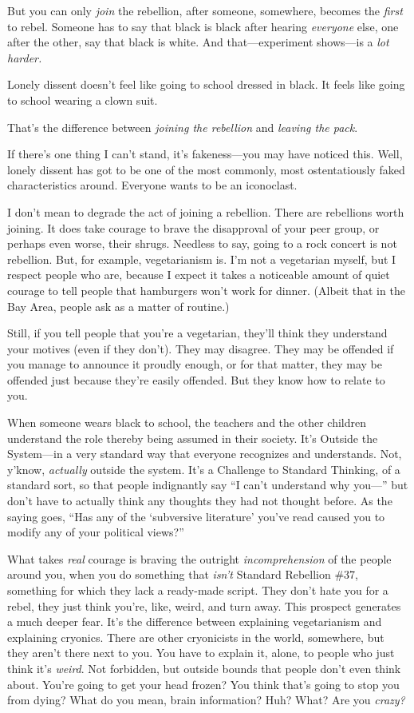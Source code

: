 {
 But you can only \textit{join} the rebellion, after someone,
somewhere, becomes the \textit{first} to rebel. Someone has to say that
black is black after hearing \textit{everyone} else, one after the
other, say that black is white. And that---experiment shows---is a
\textit{lot harder.}}

{
 Lonely dissent doesn't feel like going to school
dressed in black. It feels like going to school wearing a clown suit.}

{
 That's the difference between \textit{joining the
rebellion} and \textit{leaving the pack}.}

{
 If there's one thing I can't
stand, it's fakeness---you may have noticed this. Well,
lonely dissent has got to be one of the most commonly, most
ostentatiously faked characteristics around. Everyone wants to be an
iconoclast.}

{
 I don't mean to degrade the act of joining a
rebellion. There are rebellions worth joining. It does take courage to
brave the disapproval of your peer group, or perhaps even worse, their
shrugs. Needless to say, going to a rock concert is not rebellion. But,
for example, vegetarianism is. I'm not a vegetarian
myself, but I respect people who are, because I expect it takes a
noticeable amount of quiet courage to tell people that hamburgers
won't work for dinner. (Albeit that in the Bay Area,
people ask as a matter of routine.)}

{
 Still, if you tell people that you're a
vegetarian, they'll think they understand your motives
(even if they don't). They may disagree. They may be
offended if you manage to announce it proudly enough, or for that
matter, they may be offended just because they're
easily offended. But they know how to relate to you.}

{
 When someone wears black to school, the teachers and the other
children understand the role thereby being assumed in their society.
It's Outside the System---in a very standard way that
everyone recognizes and understands. Not, y'know,
\textit{actually} outside the system. It's a Challenge
to Standard Thinking, of a standard sort, so that people indignantly
say ``I can't understand why
you---'' but don't have to actually
think any thoughts they had not thought before. As the saying goes,
``Has any of the `subversive
literature' you've read caused you to
modify any of your political views?''}

{
 What takes \textit{real} courage is braving the outright
\textit{incomprehension} of the people around you, when you do
something that \textit{isn't} Standard Rebellion \#37,
something for which they lack a ready-made script. They
don't hate you for a rebel, they just think
you're, like, weird, and turn away. This prospect
generates a much deeper fear. It's the difference
between explaining vegetarianism and explaining cryonics. There are
other cryonicists in the world, somewhere, but they
aren't there next to you. You have to explain it,
alone, to people who just think it's \textit{weird}.
Not forbidden, but outside bounds that people don't
even think about. You're going to get your head frozen?
You think that's going to stop you from dying? What do
you mean, brain information? Huh? What? Are you \textit{crazy?}}

